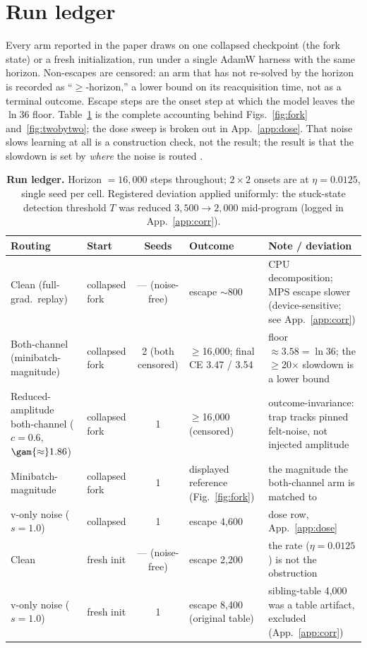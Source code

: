 \appendix

\section{Run ledger}
\label{app:ledger}
Every arm reported in the paper draws on one collapsed checkpoint (the fork
state) or a fresh initialization, run under a single AdamW harness with the same
horizon. Non-escapes are censored: an arm that has not re-solved by the horizon
is recorded as ``$\ge$-horizon,'' a lower bound on its reacquisition time, not
as a terminal outcome. Escape steps are the onset step at which the model leaves
the $\ln 36$ floor. Table~\ref{tab:ledger} is the complete accounting behind
Figs.~\ref{fig:fork} and~\ref{fig:twobytwo}; the dose sweep is broken out in
App.~\ref{app:dose}. That noise slows learning at all is a construction check,
not the result; the result is that the slowdown is set by \emph{where} the noise
is routed \citep{position}.

\begin{table}[h]
\centering
\footnotesize
\setlength{\tabcolsep}{4pt}
\begin{tabular}{@{}p{2.5cm} p{1.7cm} c p{2.4cm} p{3.5cm}@{}}
\toprule
Routing & Start & Seeds & Outcome & Note / deviation \\
\midrule
Clean (full-grad.\ replay) & collapsed fork & --- (noise-free) & escape $\sim$800 & CPU decomposition; MPS escape slower (device-sensitive; see App.~\ref{app:corr}) \\
Both-channel (minibatch-magnitude) & collapsed fork & 2 (both censored) & $\ge$16{,}000; final CE 3.47 / 3.54 & floor $\approx 3.58=\ln 36$; the $\ge$20$\times$ slowdown is a lower bound \\
Reduced-amplitude both-channel ($c{=}0.6$, $\gam{\approx}1.86$) & collapsed fork & 1 & $\ge$16{,}000 (censored) & outcome-invariance: trap tracks pinned felt-noise, not injected amplitude \\
Minibatch-magnitude & collapsed fork & 1 & displayed reference (Fig.~\ref{fig:fork}) & the magnitude the both-channel arm is matched to \\
v-only noise ($s{=}1.0$) & collapsed & 1 & escape 4{,}600 & dose row, App.~\ref{app:dose} \\
Clean & fresh init & --- (noise-free) & escape 2{,}200 & the rate ($\eta{=}0.0125$) is not the obstruction \\
v-only noise ($s{=}1.0$) & fresh init & 1 & escape 8{,}400 (original table) & sibling-table 4{,}000 was a table artifact, excluded (App.~\ref{app:corr}) \\
\bottomrule
\end{tabular}
\caption{\textbf{Run ledger.} Horizon $=16{,}000$ steps throughout; $2\times2$
onsets are at $\eta=0.0125$, single seed per cell. Registered deviation applied
uniformly: the stuck-state detection threshold $T$ was reduced $3{,}500\to2{,}000$
mid-program (logged in App.~\ref{app:corr}).}
\label{tab:ledger}
\end{table}

